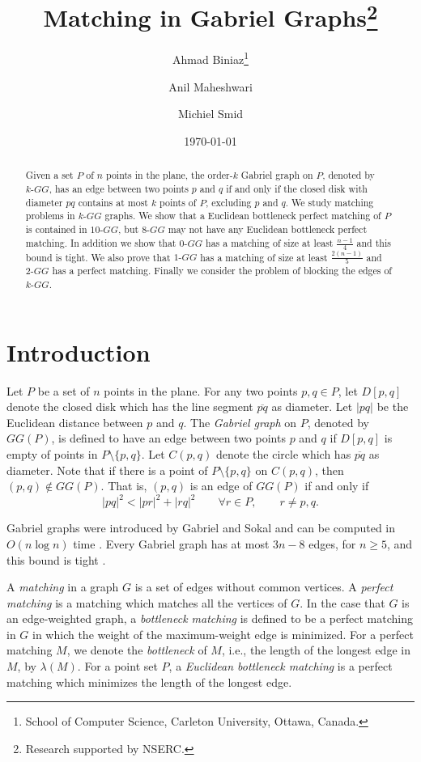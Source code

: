 \documentclass[11pt,a4paper]{article}
\title{Matching in Gabriel Graphs\thanks{Research supported by NSERC.}}
\author{
Ahmad Biniaz\thanks{School of Computer Science, Carleton University, 
                    Ottawa, Canada.}
\and 
Anil Maheshwari\footnotemark[2]
\and 
Michiel Smid\footnotemark[2]
}
\date{\today}
\newcommand{\kGG}[2]{$#1\text{-}GG#2$}
\newcommand{\CD}[2]{D[#1,#2]}
\begin{document}
\maketitle

\begin{abstract}
Given a set $P$ of $n$ points in the plane, the order-$k$ Gabriel graph on $P$, denoted by \kGG{k}{}, has an edge between two points $p$ and $q$ if and only if the closed disk with diameter $pq$ contains at most $k$ points of $P$, excluding $p$ and $q$. We study matching problems in \kGG{k}{} graphs. We show that a Euclidean bottleneck perfect matching of $P$ is contained in \kGG{10}{}, but \kGG{8}{} may not have any Euclidean bottleneck perfect matching. In addition we show that \kGG{0}{} has a matching of size at least $\frac{n-1}{4}$ and this bound is tight. We also prove that \kGG{1}{} has a matching of size at least $\frac{2(n-1)}{5}$ and \kGG{2}{} has a perfect matching. Finally we consider the problem of blocking the edges of \kGG{k}{}.
\end{abstract}

\section{Introduction}
Let $P$ be a set of $n$ points in the plane. For any two points $p,q\in P$, let $\CD{p}{q}$ denote the closed disk which has the line segment $\overline{pq}$ as diameter. Let $|pq|$ be the Euclidean distance between $p$ and $q$.
The {\em Gabriel graph} on $P$, denoted by $GG(P)$, is defined to have an edge between two points $p$ and $q$ if $\CD{p}{q}$ is empty of points in $P\setminus\{p,q\}$. Let $C(p,q)$ denote the circle which has $\overline{pq}$ as diameter. Note that if there is a point of $P\setminus\{p,q\}$ on $C(p,q)$, then $(p,q)\notin GG(P)$. That is, $(p,q)$ is an edge of $GG(P)$ if and only if $$|pq|^2<|pr|^2+|rq|^2\quad\quad \forall r\in P,\quad\quad r\neq p,q.$$

Gabriel graphs were introduced by Gabriel and Sokal \cite{Gabriel1969} and can be computed in $O(n\log n)$ time \cite{Matula1980}. Every Gabriel graph has at most $3n-8$ edges, for $n\ge 5$, and this bound is tight \cite{Matula1980}. 

A {\em matching} in a graph $G$ is a set of edges without common vertices. A {\em perfect matching} is a matching which matches all the vertices of $G$. 
In the case that $G$ is an edge-weighted graph, a {\em bottleneck matching} is defined to be a perfect matching in $G$ in which the weight of the maximum-weight edge is minimized. For a perfect matching $M$, we denote the {\em bottleneck} of $M$, i.e., the length of the longest edge in $M$, by $\lambda(M)$. For a point set $P$, a {\em Euclidean bottleneck matching} is a perfect matching which minimizes the length of the longest edge. 
\end{document}
